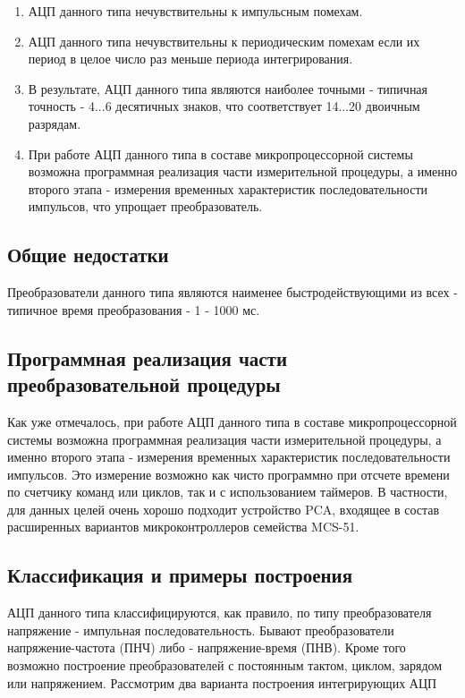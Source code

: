 \documentclass[unicode, 12pt, a4paper, oneside]{article}
\begin{document}
\begin{enumerate}
\item АЦП данного типа нечувствительны к импульсным помехам.
\item АЦП данного типа нечувствительны к периодическим помехам если их период в целое число раз меньше периода интегрирования.
\item В результате, АЦП данного типа являются наиболее точными - типичная точность - 4...6 десятичных знаков, что соответствует 14...20 двоичным разрядам.
\item При работе АЦП данного типа в составе микропроцессорной системы возможна программная реализация части измерительной процедуры, а именно второго этапа - измерения временных характеристик последовательности импульсов, что упрощает преобразователь.
\end{enumerate}

\subsection*{Общие недостатки}

Преобразователи данного типа являются наименее быстродействующими из всех - типичное время преобразования - 1 - 1000 мс.

\subsection*{Программная реализация части преобразовательной процедуры}

Как уже отмечалось, при работе АЦП данного типа в составе микропроцессорной системы возможна программная реализация части измерительной процедуры, а именно второго этапа - измерения временных характеристик последовательности импульсов. Это измерение возможно как чисто программно при отсчете времени по счетчику команд или циклов, так и с использованием таймеров. В частности, для данных целей очень хорошо подходит устройство PCA, входящее в состав расширенных вариантов микроконтроллеров семейства MCS-51.

\subsection*{Классификация и примеры построения}

АЦП данного типа классифицируются, как правило, по типу преобразователя напряжение - импульная последовательность. Бывают преобразователи напряжение-частота (ПНЧ) либо - напряжение-время (ПНВ). Кроме того возможно построение преобразователей с постоянным тактом, циклом, зарядом или напряжением. Рассмотрим два варианта построения интегрирующих АЦП
\end{document}
